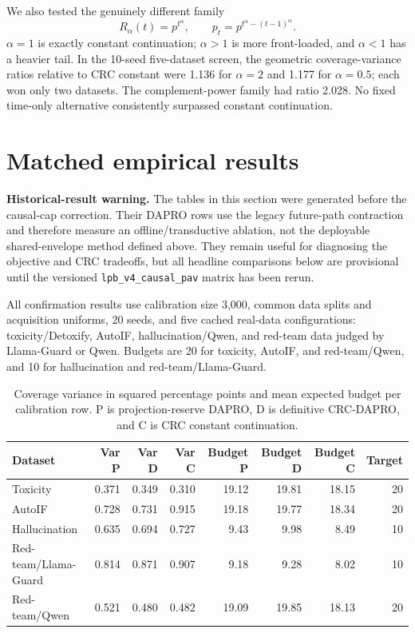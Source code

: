\documentclass[10pt]{article}
\begin{document}
We also tested the genuinely different family
\[
R_\alpha(t)=p^{t^\alpha},\qquad
p_t=p^{t^\alpha-(t-1)^\alpha}.
\]
$\alpha=1$ is exactly constant continuation; $\alpha>1$ is more front-loaded,
and $\alpha<1$ has a heavier tail.  In the 10-seed five-dataset screen, the
geometric coverage-variance ratios relative to CRC constant were 1.136 for
$\alpha=2$ and 1.177 for $\alpha=0.5$; each won only two datasets.  The
complement-power family had ratio 2.028.  No fixed time-only alternative
consistently surpassed constant continuation.

\section{Matched empirical results}

\textbf{Historical-result warning.}
The tables in this section were generated before the causal-cap correction.
Their DAPRO rows use the legacy future-path contraction and therefore measure
an offline/transductive ablation, not the deployable shared-envelope method
defined above.  They remain useful for diagnosing the objective and CRC
tradeoffs, but all headline comparisons below are provisional until the
versioned \texttt{lpb\_v4\_causal\_pav} matrix has been rerun.

All confirmation results use calibration size 3,000, common data splits and
acquisition uniforms, 20 seeds, and five cached real-data configurations:
toxicity/Detoxify, AutoIF, hallucination/Qwen, and red-team data judged by
Llama-Guard or Qwen.  Budgets are 20 for toxicity, AutoIF, and red-team/Qwen,
and 10 for hallucination and red-team/Llama-Guard.

\begin{table}[t]
\centering
\small
\caption{Coverage variance in squared percentage points and mean expected
budget per calibration row.  P is projection-reserve DAPRO, D is definitive
CRC-DAPRO, and C is CRC constant continuation.}
\label{tab:main}
\begin{tabular}{lrrrrrrr}
\toprule
Dataset & Var P & Var D & Var C & Budget P & Budget D & Budget C & Target\\
\midrule
Toxicity & 0.371 & 0.349 & 0.310 & 19.12 & 19.81 & 18.15 & 20\\
AutoIF & 0.728 & 0.731 & 0.915 & 19.18 & 19.77 & 18.34 & 20\\
Hallucination & 0.635 & 0.694 & 0.727 & 9.43 & 9.98 & 8.49 & 10\\
Red-team/Llama-Guard & 0.814 & 0.871 & 0.907 & 9.18 & 9.28 & 8.02 & 10\\
Red-team/Qwen & 0.521 & 0.480 & 0.482 & 19.09 & 19.85 & 18.13 & 20\\
\bottomrule
\end{tabular}
\end{table}
\end{document}
